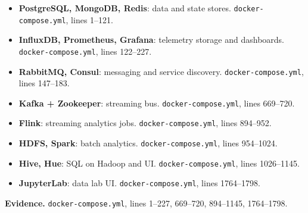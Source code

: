 \documentclass[conference]{IEEEtran}
\begin{document}
\begin{itemize}
\item \textbf{PostgreSQL, MongoDB, Redis}: data and state stores. \texttt{docker-compose.yml}, lines 1--121.
\item \textbf{InfluxDB, Prometheus, Grafana}: telemetry storage and dashboards. \texttt{docker-compose.yml}, lines 122--227.
\item \textbf{RabbitMQ, Consul}: messaging and service discovery. \texttt{docker-compose.yml}, lines 147--183.
\item \textbf{Kafka + Zookeeper}: streaming bus. \texttt{docker-compose.yml}, lines 669--720.
\item \textbf{Flink}: streaming analytics jobs. \texttt{docker-compose.yml}, lines 894--952.
\item \textbf{HDFS, Spark}: batch analytics. \texttt{docker-compose.yml}, lines 954--1024.
\item \textbf{Hive, Hue}: SQL on Hadoop and UI. \texttt{docker-compose.yml}, lines 1026--1145.
\item \textbf{JupyterLab}: data lab UI. \texttt{docker-compose.yml}, lines 1764--1798.
\end{itemize}

\textbf{Evidence.} \texttt{docker-compose.yml}, lines 1--227, 669--720, 894--1145, 1764--1798.
\end{document}
